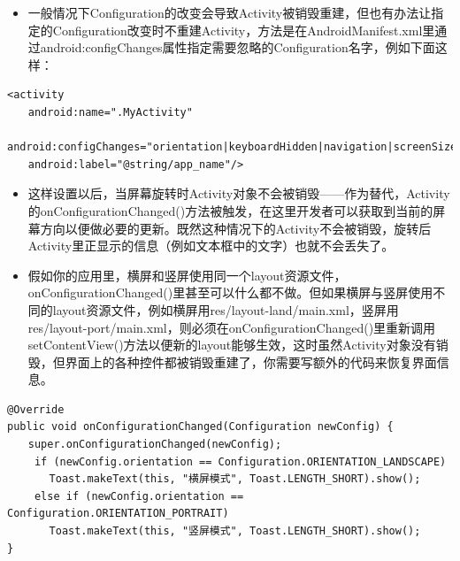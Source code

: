 \documentclass[9pt, b5paper]{article}
\begin{document}
\begin{itemize}
\item 一般情况下Configuration的改变会导致Activity被销毁重建，但也有办法让指定的Configuration改变时不重建Activity，方法是在AndroidManifest.xml里通过android:configChanges属性指定需要忽略的Configuration名字，例如下面这样：
\end{itemize}
\begin{verbatim}
<activity 
　　android:name=".MyActivity" 
    android:configChanges="orientation|keyboardHidden|navigation|screenSize"
　　android:label="@string/app_name"/>
\end{verbatim}
\begin{itemize}
\item 这样设置以后，当屏幕旋转时Activity对象不会被销毁——作为替代，Activity的onConfigurationChanged()方法被触发，在这里开发者可以获取到当前的屏幕方向以便做必要的更新。既然这种情况下的Activity不会被销毁，旋转后Activity里正显示的信息（例如文本框中的文字）也就不会丢失了。
\item 假如你的应用里，横屏和竖屏使用同一个layout资源文件，onConfigurationChanged()里甚至可以什么都不做。但如果横屏与竖屏使用不同的layout资源文件，例如横屏用res/layout-land/main.xml，竖屏用res/layout-port/main.xml，则必须在onConfigurationChanged()里重新调用setContentView()方法以便新的layout能够生效，这时虽然Activity对象没有销毁，但界面上的各种控件都被销毁重建了，你需要写额外的代码来恢复界面信息。
\end{itemize}
\begin{verbatim}
@Override 
public void onConfigurationChanged(Configuration newConfig) { 
　　super.onConfigurationChanged(newConfig); 
 　　if (newConfig.orientation == Configuration.ORIENTATION_LANDSCAPE) 
　　　　Toast.makeText(this, "横屏模式", Toast.LENGTH_SHORT).show(); 
 　　else if (newConfig.orientation == Configuration.ORIENTATION_PORTRAIT)
　　　　Toast.makeText(this, "竖屏模式", Toast.LENGTH_SHORT).show(); 
}
\end{verbatim}
\end{document}
